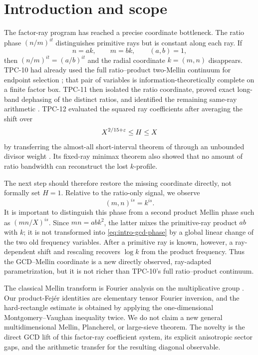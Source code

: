 \section{Introduction and scope}
\label{sec:introduction}

The factor-ray program has reached a precise coordinate bottleneck.
The ratio phase $(n/m)^{it}$ distinguishes primitive rays but is constant
along each ray.  If
\[
 n=ak,\qquad m=bk,\qquad (a,b)=1,
\]
then $(n/m)^{it}=(a/b)^{it}$ and the radial coordinate $k=(m,n)$
disappears.  TPC-10 had already used the full ratio--product two-Mellin
continuum for endpoint selection \citep{WangTPC10}; that pair of
variables is information-theoretically complete on a finite factor box.
TPC-11 then isolated the ratio coordinate, proved exact long-band
dephasing of the distinct ratios, and identified the remaining same-ray arithmetic
\citep{WangTPC11}.  TPC-12 evaluated the squared ray coefficients after
averaging the shift over
\[
 X^{2/15+\varepsilon}\leq H\leq X
\]
by transferring the almost-all short-interval theorem of
\citet{GuthMaynard2026} through an unbounded divisor weight
\citep{WangTPC12}.  Its fixed-ray minimax theorem also showed that no
amount of ratio bandwidth can reconstruct the lost $k$-profile.

The next step should therefore restore the missing coordinate directly,
not formally set $H=1$.  Relative to the ratio-only signal, we observe
\begin{equation}
 (m,n)^{is}=k^{is}.
 \label{eq:intro-gcd-phase}
\end{equation}
It is important to distinguish this phase from a second product Mellin
phase such as $(mn/X)^{is}$.  Since $mn=abk^2$, the latter mixes the
primitive-ray product $ab$ with $k$; it is not transformed into
\eqref{eq:intro-gcd-phase} by a global linear change of the two old
frequency variables.  After a primitive ray is known, however, a
ray-dependent shift and rescaling recovers $\log k$ from the product
frequency.  Thus the GCD--Mellin coordinate is a new directly observed,
ray-adapted parametrization, but it is not richer than TPC-10's full
ratio--product continuum.

The classical Mellin transform is Fourier analysis on the multiplicative
group \citep{ButzerJansche1997}.  Our product-Fej\'er identities are
elementary tensor Fourier inversion, and the hard-rectangle estimate is
obtained by applying the one-dimensional Montgomery--Vaughan inequality
twice.  We do not claim a new general multidimensional Mellin,
Plancherel, or large-sieve theorem.  The novelty is the direct GCD lift
of this factor-ray coefficient system, its explicit anisotropic sector
gaps, and the arithmetic transfer for the resulting diagonal observable.


